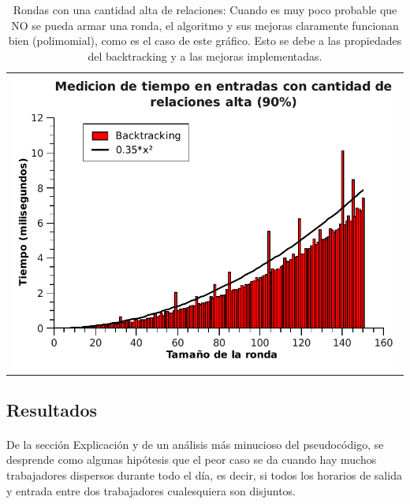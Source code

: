 \begin{table}[h!] %
\centering %
\begin{tabular}{c}
\includegraphics[scale=0.7]{../Ej_2/Otros/Graficos/Graph90.pdf} \\
\end{tabular}

\caption{Rondas con una cantidad alta de relaciones: Cuando es muy poco probable que NO se pueda armar una ronda, el algoritmo y sus mejoras claramente funcionan bien (polimomial), como es el caso de este gráfico. Esto se debe a las propiedades del backtracking y a las mejoras implementadas.} %
\label{tiempoEj2c} %
\end{table}


\pagebreak[4]
\clearpage

\subsection{Resultados}
\label{resultadosej3}

\paragraph{}
De la sección Explicación y de un análisis más minucioso del pseudocódigo, se desprende como algunas hipótesis
 que el peor caso se da cuando hay muchos trabajadores dispersos durante todo el día, es decir, si todos los horarios de salida y entrada entre dos trabajadores cualesquiera son disjuntos.

